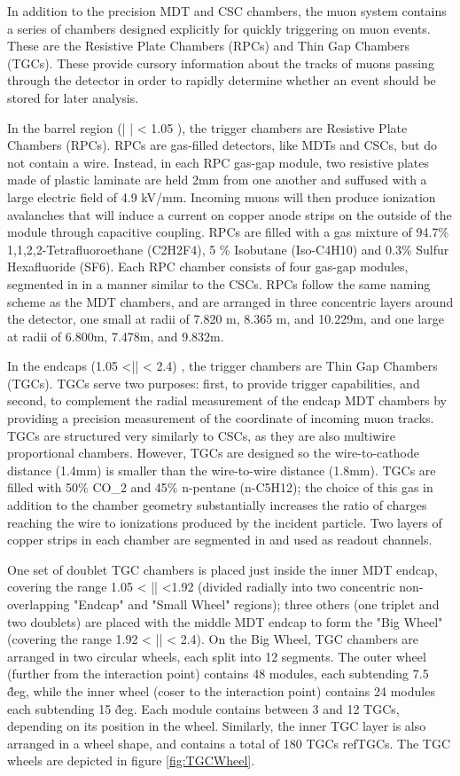 In addition to the precision MDT and CSC chambers, the muon system contains a series of chambers designed explicitly for quickly triggering on muon events. These are the Resistive Plate Chambers (RPCs) and Thin Gap Chambers (TGCs). These provide cursory information about the tracks of muons passing through the detector in order to rapidly determine whether an event should be stored for later analysis.

In the barrel region (| \eta | < 1.05 ), the trigger chambers are Resistive Plate Chambers (RPCs). RPCs are gas-filled detectors, like MDTs and CSCs, but do not contain a wire. Instead, in each RPC gas-gap module, two resistive plates made of plastic laminate are held 2mm from one another and suffused with a large electric field of 4.9 kV/mm. Incoming muons will then produce ionization avalanches that will induce a current on copper anode strips on the outside of the module through capacitive coupling. RPCs are filled with a gas mixture of 94.7\% 1,1,2,2-Tetrafluoroethane (C2H2F4), 5 \% Isobutane (Iso-C4H10) and 0.3\% Sulfur Hexafluoride (SF6). Each RPC chamber consists of four gas-gap modules, segmented in \phi in a manner similar to the CSCs. RPCs follow the same naming scheme as the MDT chambers, and are arranged in three concentric layers around the detector, one small at radii of 7.820 m, 8.365 m, and 10.229m, and one large at radii of 6.800m, 7.478m, and 9.832m.

In the endcaps (1.05 <|\eta| < 2.4) , the trigger chambers are Thin Gap Chambers (TGCs). TGCs serve two purposes: first, to provide trigger capabilities, and second, to complement the radial measurement of the endcap MDT chambers by providing a precision measurement of the \phi coordinate of incoming muon tracks. TGCs are structured very similarly to CSCs, as they are also multiwire proportional chambers. However, TGCs are designed so the wire-to-cathode distance (1.4mm) is smaller than the wire-to-wire distance (1.8mm). TGCs are filled with 50\% CO_2 and 45\% n-pentane (n-C5H12); the choice of this gas in addition to the chamber geometry substantially increases the ratio of charges reaching the wire to ionizations produced by the incident particle. Two layers of copper strips in each chamber are segmented in \phi and used as readout channels.

One set of doublet TGC chambers is placed just inside the inner MDT endcap, covering the range 1.05 < |\eta| <1.92 (divided radially into two concentric non-overlapping "Endcap" and "Small Wheel" regions); three others (one triplet and two doublets) are placed with the middle MDT endcap to form the "Big Wheel" (covering the range 1.92 < |\eta| < 2.4). On the Big Wheel, TGC chambers are arranged in two circular wheels, each split into 12 segments. The outer wheel (further from the interaction point) contains 48 modules, each subtending 7.5 \^deg, while the inner wheel (coser to the interaction point) contains 24 modules each subtending 15 \^deg. Each module contains between 3 and 12 TGCs, depending on its position in the wheel. Similarly, the inner TGC layer is also arranged in a wheel shape, and contains a total of 180 TGCs ref{TGCs}. The TGC wheels are depicted in figure \ref{fig:TGCWheel}.

